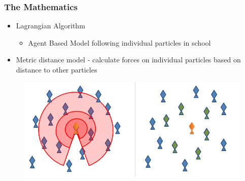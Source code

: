 \documentclass[xcolor=dvipsnames]{beamer}
\begin{document}
\begin{frame}
	\frametitle{The Mathematics}
	\begin{itemize}
		\item Lagrangian Algorithm
		\begin{itemize}
			\item Agent Based Model following individual particles in school
		\end{itemize}
		\item Metric distance model - calculate forces on individual particles based on distance to other particles
	\end{itemize}
	\begin{figure}
		\centering
%

	\includegraphics[scale=0.25]{images/distance_models.png}
	\end{figure}
\end{frame}
\end{document}
